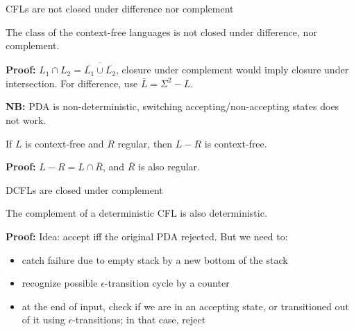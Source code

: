 \documentclass[handout]{beamer}
\begin{document}
\begin{frame}{CFLs are not closed under difference nor complement}

    \begin{theorem}
        The class of the context-free languages is not closed under difference, nor complement.
    \end{theorem}

    \textbf{Proof:} $L_1\cap L_2=\overline{\overline{L_1}\cup\overline{L_2}}$, closure under complement would imply closure under intersection. For difference, use $\overline{L}=\Sigma^2-L$.\hfill\qedsymbol

    \textbf{NB:} PDA is non-deterministic, switching accepting/non-accepting states does not work.

    \medskip

    \begin{proposition}
        If $L$ is context-free and $R$ regular, then $L-R$ is context-free.
    \end{proposition}

    \textbf{Proof:} $L-R=L\cap\overline{R}$, and $\overline{R}$ is also regular.\hfill\qedsymbol 

\end{frame}


\begin{frame}{DCFLs are closed under complement}

    \begin{theorem}
        The complement of a deterministic CFL is also deterministic.
    \end{theorem}
    \textbf{Proof:} Idea: accept iff the original PDA rejected. But we need to:
    \begin{itemize}
        \item catch failure due to empty stack by a new bottom of the stack
        \item recognize possible $\epsilon$-transition cycle by a counter
        \item at the end of input, check if we are in an accepting state, or transitioned out of it using $\epsilon$-transitions; in that case, reject
    \end{itemize}
    \hfill\qedsymbol

\end{frame}
\end{document}
